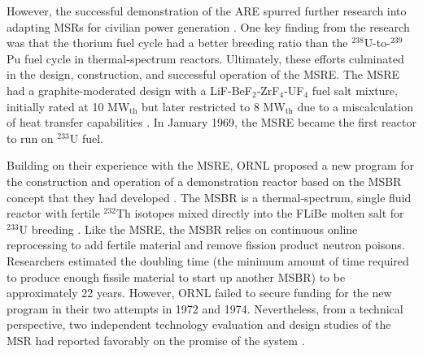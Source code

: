However, the successful demonstration of the \gls{ARE} spurred further
research into adapting \glspl{MSR} for civilian power generation
\cite{rosenthal_molten-salt_1970}. One key finding from the
research was that the thorium fuel cycle had a better breeding ratio than the
$^{238}$U-to-$^{239}$Pu fuel cycle in thermal-spectrum reactors.
Ultimately, these efforts culminated in the design, construction, and
successful operation of the \gls{MSRE}. The \gls{MSRE} had a
graphite-moderated design with a LiF-BeF$_2$-ZrF$_4$-UF$_4$ fuel salt mixture,
initially rated at 10 MW$_{\text{th}}$ but later restricted to 8
MW$_{\text{th}}$ due to a miscalculation of heat transfer capabilities
\cite{haubenreich_experience_1970}. In January 1969, the \gls{MSRE} became the
first reactor to run on $^{233}$U fuel.

Building on their experience with the \gls{MSRE}, \gls{ORNL} proposed a
new program for the construction and operation of a demonstration reactor
based on the \gls{MSBR} concept that they had
developed \cite{macpherson_molten_1985}. The \gls{MSBR} is a thermal-spectrum,
single fluid reactor with fertile $^{232}$Th isotopes mixed directly into the
FLiBe molten salt for $^{233}$U breeding \cite{gehin_liquid_2016}. Like the
\gls{MSRE}, the \gls{MSBR} relies on continuous online reprocessing to add
fertile material and remove fission product neutron poisons. Researchers
estimated the doubling time (the minimum amount of time required to produce
enough fissile material to start up another \gls{MSBR}) to be
approximately 22 years. However, \gls{ORNL} failed to secure funding for the
new program in their two attempts in 1972 and 1974. Nevertheless, from a
technical perspective, two independent
technology evaluation and design studies of the \gls{MSR} had reported
favorably on the promise of the system \cite{macpherson_molten_1985}.

